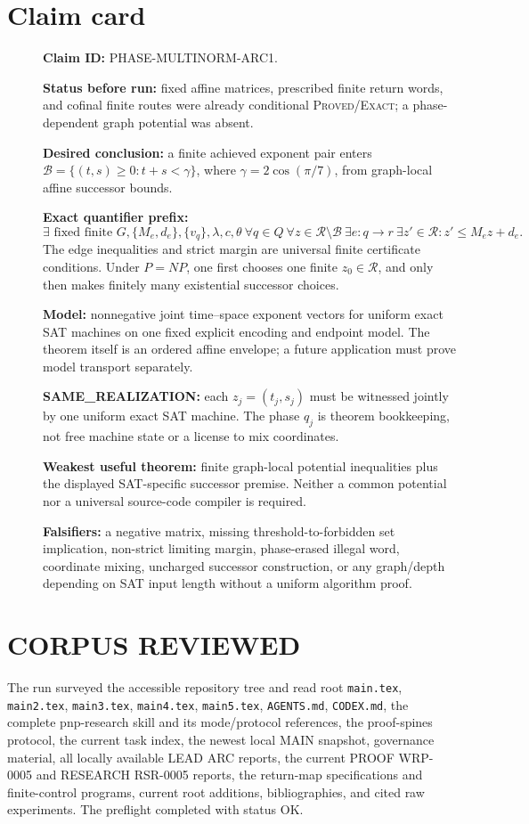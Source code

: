 \documentclass[11pt]{article}
\newcommand{\R}{\mathcal R}
\newcommand{\B}{\mathcal B}
\begin{document}
\section{Claim card}
\begin{description}
\item[] \textbf{Claim ID:} PHASE-MULTINORM-ARC1.
\item[] \textbf{Status before run:} fixed affine matrices, prescribed finite
return words, and cofinal finite routes were already conditional
\textsc{Proved/Exact}; a phase-dependent graph potential was absent.
\item[] \textbf{Desired conclusion:} a finite achieved exponent pair enters
\(\B=\{(t,s)\ge0:t+s<\gamma\}\), where
\(\gamma=2\cos(\pi/7)\), from graph-local affine successor bounds.
\item[] \textbf{Exact quantifier prefix:}
\[
\exists\text{ fixed finite }G,\{M_e,d_e\},\{v_q\},\lambda,c,\theta\
\forall q\in Q\ \forall z\in\R\setminus\B\
\exists e:q\to r\ \exists z'\in\R:
z'\le M_ez+d_e.
\]
The edge inequalities and strict margin are universal finite certificate
conditions.  Under \(P=NP\), one first chooses one finite
\(z_0\in\R\), and only then makes finitely many existential successor choices.
\item[] \textbf{Model:} nonnegative joint time--space exponent vectors for
uniform exact SAT machines on one fixed explicit encoding and endpoint model.
The theorem itself is an ordered affine envelope; a future application must
prove model transport separately.
\item[] \textbf{SAME\_REALIZATION:} each \(z_j=(t_j,s_j)\) must be witnessed
jointly by one uniform exact SAT machine.  The phase \(q_j\) is theorem
bookkeeping, not free machine state or a license to mix coordinates.
\item[] \textbf{Weakest useful theorem:} finite graph-local potential
inequalities plus the displayed SAT-specific successor premise.  Neither a
common potential nor a universal source-code compiler is required.
\item[] \textbf{Falsifiers:} a negative matrix, missing threshold-to-forbidden
set implication, non-strict limiting margin, phase-erased illegal word,
coordinate mixing, uncharged successor construction, or any graph/depth
depending on SAT input length without a uniform algorithm proof.
\end{description}

\section{CORPUS REVIEWED}
The run surveyed the accessible repository tree and read root
\texttt{main.tex}, \texttt{main2.tex}, \texttt{main3.tex},
\texttt{main4.tex}, \texttt{main5.tex}, \texttt{AGENTS.md},
\texttt{CODEX.md}, the complete pnp-research skill and its mode/protocol
references, the proof-spines protocol, the current task index, the newest
local MAIN snapshot, governance material, all locally available LEAD
ARC reports, the current PROOF WRP-0005 and RESEARCH RSR-0005 reports, the
return-map specifications and finite-control programs, current root
additions, bibliographies, and cited raw experiments.  The preflight
completed with status OK.
\end{document}
